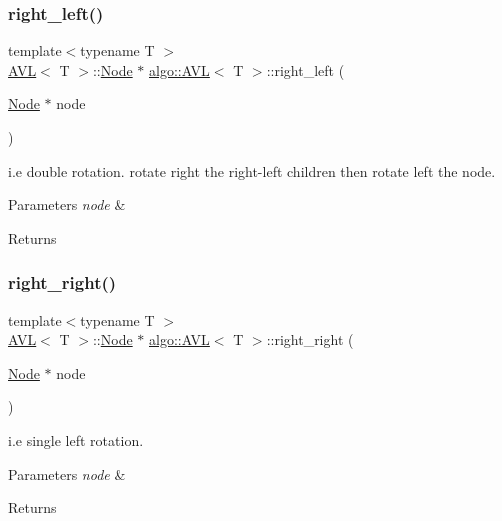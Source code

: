 \subsubsection{\texorpdfstring{right\+\_\+left()}{right\_left()}}
{\footnotesize\ttfamily template$<$typename T $>$ \\
\hyperlink{classalgo_1_1_a_v_l}{A\+VL}$<$ T $>$\+::\hyperlink{structalgo_1_1_a_v_l_1_1_node}{Node} $\ast$ \hyperlink{classalgo_1_1_a_v_l}{algo\+::\+A\+VL}$<$ T $>$\+::right\+\_\+left (\begin{DoxyParamCaption}\item[{\hyperlink{structalgo_1_1_a_v_l_1_1_node}{Node} $\ast$}]{node }\end{DoxyParamCaption})}


\begin{DoxyItemize}
\item i.\+e double rotation. rotate right the right-\/left children then rotate left the node. 
\begin{DoxyParams}{Parameters}
{\em node} & \\
\hline
\end{DoxyParams}
\begin{DoxyReturn}{Returns}

\end{DoxyReturn}

\end{DoxyItemize}\mbox{\label{classalgo_1_1_a_v_l_aa74c017f8c6365d744427ec2e0cf0b10}} 
\subsubsection{\texorpdfstring{right\+\_\+right()}{right\_right()}}
{\footnotesize\ttfamily template$<$typename T $>$ \\
\hyperlink{classalgo_1_1_a_v_l}{A\+VL}$<$ T $>$\+::\hyperlink{structalgo_1_1_a_v_l_1_1_node}{Node} $\ast$ \hyperlink{classalgo_1_1_a_v_l}{algo\+::\+A\+VL}$<$ T $>$\+::right\+\_\+right (\begin{DoxyParamCaption}\item[{\hyperlink{structalgo_1_1_a_v_l_1_1_node}{Node} $\ast$}]{node }\end{DoxyParamCaption})}

i.\+e single left rotation. 
\begin{DoxyParams}{Parameters}
{\em node} & \\
\hline
\end{DoxyParams}
\begin{DoxyReturn}{Returns}

\end{DoxyReturn}
\mbox{\label{classalgo_1_1_a_v_l_afb36fcddfc7b0dbbfeca1ab90b166997}} 
